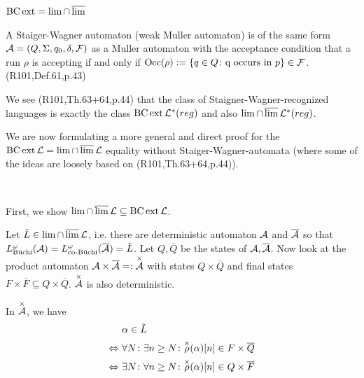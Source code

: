 \subsection{$\operatorname{BC} \operatorname{ext} = \lim \cap \operatorname{\overline{lim}}$}
\label{gen:staiger-wagner}
A Staiger-Wagner automaton (weak Muller automaton) is of the same form $\mathcal{A} = (Q,\Sigma,q_0,\delta,\mathcal{F})$ as a Muller automaton with the acceptance condition that a run $\rho$ is accepting if and only if $\Occ(\rho) := \Set{q \in Q \colon \text{q occurs in } p} \in \F$.  (R101,Def.61,p.43)

We see (R101,Th.63+64,p.44) that the class of Staigner-Wagner-recognized languages is exactly the class $\operatorname{BC} \operatorname{ext} \mathcal{L}^*(reg)$ and also $\lim \cap \operatorname{\overline{lim}} \mathcal{L}^*(reg)$.

We are now formulating a more general and direct proof for the $\operatorname{BC} \operatorname{ext} \mathcal{L} = \lim \cap \operatorname{\overline{lim}} \mathcal{L}$ equality without Staiger-Wagner-automata (where some of the ideas are loosely based on (R101,Th.63+64,p.44)).

\

First, we show $\lim \cap \operatorname{\overline{lim}} \mathcal{L} \subseteq \operatorname{BC} \operatorname{ext} \mathcal{L}$.

Let $\tilde L \in \lim \cap \operatorname{\overline{lim}} \mathcal{L}$, i.e. there are deterministic automaton $\mathcal{A}$ and $\overline {\mathcal{A}}$ so that $L^\omega_{\text{Büchi}}(\mathcal{A}) = L^\omega_{\text{co-Büchi}}(\overline {\mathcal{A}}) = \tilde L$. Let $Q,\overline Q$ be the states of $\mathcal{A},\overline {\mathcal{A}}$. Now look at the product automaton $\mathcal{A} \times \overline {\mathcal{A}} =: \overset{\times}{\mathcal{A}}$ with states $Q \times \overline Q$ and final states $F \times \overline F \subseteq Q \times \overline Q$. $\overset{\times}{\mathcal{A}}$ is also deterministic.



In $\overset{\times}{\mathcal{A}}$, we have
\begin{align*}
& \alpha \in \tilde L \\
\Leftrightarrow \ & \forall N \colon \exists n \ge N \colon \overset{\times}{\rho}(\alpha)[n] \in F \times \overline Q \\
\Leftrightarrow \ & \exists N \colon \forall n \ge N \colon \overset{\times}{\rho}(\alpha)[n] \in Q \times \overline F
\end{align*}

